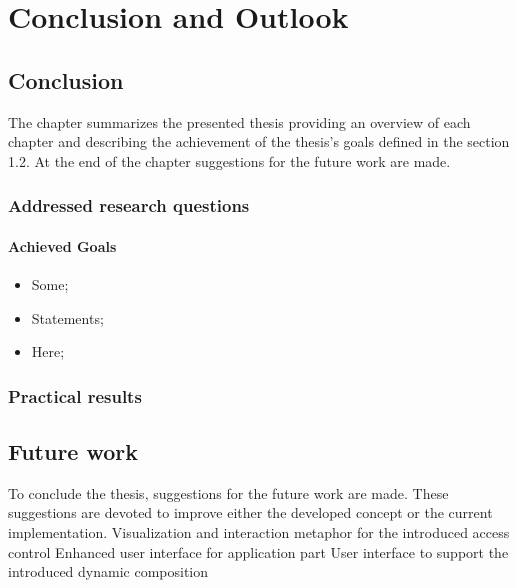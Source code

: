 \chapter{Conclusion and Outlook}

\section{Conclusion}
The chapter summarizes the presented thesis providing an overview of each chapter
and describing the achievement of the thesis’s goals defined in the section 1.2. At
the end of the chapter suggestions for the future work are made.
\subsection{Addressed research questions}

\subsubsection{Achieved Goals}

\begin{itemize}
\item Some;
\item Statements;
\item Here;
\end{itemize}

\subsection{Practical results}

\section{Future work}
To conclude the thesis, suggestions for the future work are made. These suggestions
are devoted to improve either the developed concept or the current implementation.
\newline
Visualization and interaction metaphor for the introduced access control
\newline
Enhanced user interface for application part
\newline
User interface to support the introduced dynamic composition

